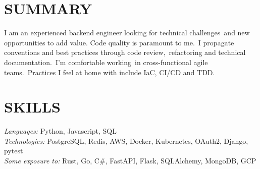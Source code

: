 \documentclass[line,margin]{res}
\begin{document}
\address{}
\address{\href{mailto://simon.r.crowe@protonmail.com}{simon.r.crowe@protonmail.com}}


\begin{resume}

\section{SUMMARY} I am an experienced backend engineer looking for technical challenges\
                  and new opportunities to add value. Code quality is paramount to me.\
                  I propagate conventions and best practices through code review,\
                  refactoring and technical documentation.\
                  I’m comfortable working\ in cross-functional agile teams.\
                  Practices I feel at home with include IaC, CI/CD and TDD.

\section{SKILLS} {\sl Languages:} Python, Javascript, SQL \\
                {\sl Technologies:} PostgreSQL, Redis, AWS, Docker, Kubernetes, OAuth2, Django, pytest \\
                {\sl Some exposure to:} Rust, Go, C\#, FastAPI, Flask, SQLAlchemy, MongoDB, GCP



\end{resume}
\end{document}
